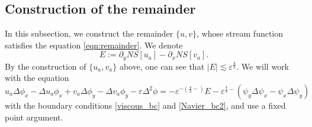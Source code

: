 \documentclass[reqno, 11pt]{amsart}
\theoremstyle{plain}
\theoremstyle{definition}
\theoremstyle{remark}
\numberwithin{equation}{section}
\begin{document}
\subsection{Construction of the remainder}\label{sec:remainder}
In this subsection, we construct the remainder $\{u,v\}$, whose stream function satisfies the equation \eqref{eqn:remainder}. We denote
$$
E := \partial_y NS[u_a] - \partial_x NS[v_a].
$$
By the construction of $\{u_a, v_a\}$ above, one can see that $|E| \lesssim \varepsilon^{\frac{4}{3}}$. We will work with the equation
\begin{equation}\label{eqn:remainder_new}
u_a \Delta \phi_x - \Delta u_a \phi_x + v_a \Delta \phi_y - \Delta v_a \phi_y - \varepsilon \Delta^2 \phi = - \varepsilon^{-(\frac{4}{3}-)}E  - \varepsilon^{\frac{4}{3}-} (\psi_y \Delta \psi_x - \psi_x \Delta \psi_y)
\end{equation}
with the boundary conditions \eqref{viscous_bc} and \eqref{Navier_bc2}, and use a fixed point argument.
\end{document}
